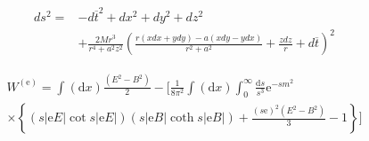 \documentclass[11pt,a4paper]{book}
\begin{document}
	
\begin{equation}
\left.\begin{aligned} d s ^ { 2 } = & - d \overline { t } ^ { 2 } + d x ^ { 2 } + d y ^ { 2 } + d z ^ { 2 } \\ & + \frac { 2 M r ^ { 3 } } { r ^ { 4 } + a ^ { 2 } z ^ { 2 } } \left( \frac { r ( x d x + y d y ) - a ( x d y - y d x ) } { r ^ { 2 } + a ^ { 2 } } + \frac { z d z } { r } + d \overline { t } \right) ^ { 2 } \end{aligned} \right.    
\end{equation}


\begin{equation}
    \left. \begin{array} { c } { W ^ { ( \mathrm { e } ) } = \int ( \mathrm { d } x ) \frac { \left( E ^ { 2 } - B ^ { 2 } \right) } { 2 } - [ \frac { 1 } { 8 \pi ^ { 2 } } \int ( \mathrm { d } x ) \int _ { 0 } ^ { \infty } \frac { \mathrm { d } s } { s ^ { 3 } } \mathrm { e } ^ { - s m ^ { 2 } } } \\ { \times \left\{ ( s | \mathrm { e } E | \cot s | \mathrm { e } E | ) ( s | \mathrm { e } B | \operatorname { coth } s | \mathrm { e } B | ) + \frac { ( s \mathrm { e } ) ^ { 2 } \left( E ^ { 2 } - B ^ { 2 } \right) } { 3 } - 1 \right\} ] } \end{array} \right.
\end{equation}













\printindex
\end{document}
